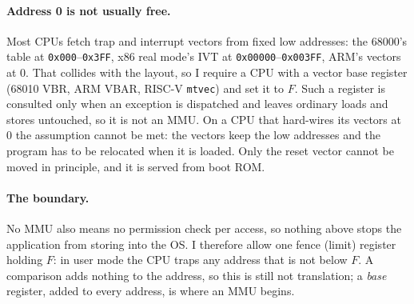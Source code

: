 \paragraph{Address 0 is not usually free.}
Most CPUs fetch trap and interrupt vectors from fixed low addresses: the 68000's table
at \texttt{0x000}--\texttt{0x3FF}, x86 real mode's IVT at
\texttt{0x00000}--\texttt{0x003FF}, ARM's vectors at 0. That collides with the layout,
so I require a CPU with a vector base register (68010 VBR, ARM VBAR, RISC-V
\texttt{mtvec}) and set it to $F$. Such a register is consulted only when an exception
is dispatched and leaves ordinary loads and stores untouched, so it is not an MMU. On a
CPU that hard-wires its vectors at 0 the assumption cannot be met: the vectors keep the
low addresses and the program has to be relocated when it is loaded. Only the reset
vector cannot be moved in principle, and it is served from boot ROM.

\paragraph{The boundary.}
No MMU also means no permission check per access, so nothing above stops the application
from storing into the OS. I therefore allow one fence (limit) register holding $F$: in
user mode the CPU traps any address that is not below $F$. A comparison adds nothing to
the address, so this is still not translation; a \emph{base} register, added to every
address, is where an MMU begins.
